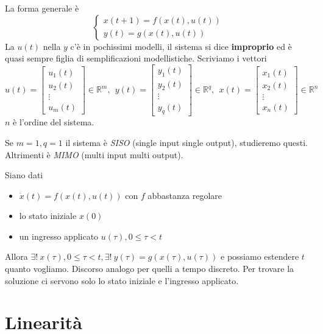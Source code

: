 La forma generale è
\begin{equation*}
	\boxed{
		\begin{cases}
			x(t+1)=f(x(t),u(t)) \\
			y(t)=g(x(t),u(t))  
		\end{cases}
	}
\end{equation*}
La $u(t)$ nella $y$ c'è in pochissimi modelli, il sistema si dice \textbf{improprio} ed è quasi sempre figlia di semplificazioni modellistiche.
Scriviamo i vettori
\begin{equation*}
	u(t)=\begin{bmatrix}
	u_1 (t)\\
	u_2 (t)\\
	\vdots \\
	u_m (t)
	\end{bmatrix} \in \mathbb{R}^m ,\ \ y(t)=\begin{bmatrix}
	y_1 (t)\\
	y_2 (t)\\
	\vdots \\
	y_q (t)
	\end{bmatrix} \in \mathbb{R}^q ,\ \ x(t)=\begin{bmatrix}
	x_1 (t)\\
	x_2 (t)\\
	\vdots \\
	x_n (t)
	\end{bmatrix} \in \mathbb{R}^n
\end{equation*}
$n$ è l'ordine del sistema.

Se $m=1,q=1$ il sistema è \textit{SISO} (single input single output), studieremo questi. Altrimenti è \textit{MIMO} (multi input multi output).

Siano dati
\begin{itemize}
	\item $\dot{x}(t) =f(x(t) ,u(t))$ con $f$ abbastanza regolare
	\item lo stato iniziale $x(0)$
	\item un ingresso applicato $u(\tau) ,0\leq \tau < t$
\end{itemize}

Allora $\exists !\ x(\tau) ,0\leq \tau < t,\exists !\ y(\tau) =g(x(\tau) ,u(\tau))$ e possiamo estendere $t$ quanto vogliamo. Discorso analogo per quelli a tempo discreto. Per trovare la soluzione ci servono solo lo stato iniziale e l'ingresso applicato.

\section{Linearità}

